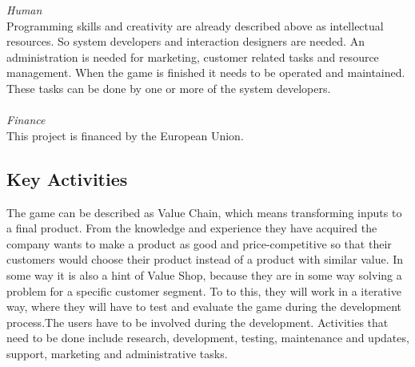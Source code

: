 \emph{Human} \\ Programming skills and creativity are already described above as intellectual resources. So system developers and interaction designers are needed. An administration is needed for marketing, customer related tasks and resource management. When the game is finished it needs to be operated and maintained. These tasks can be done by one or more of the system developers. \\ \\
\emph{Finance} \\ This project is financed by the European Union. 
\subsection{Key Activities}
The game can be described as Value Chain, which means transforming inputs to a final product. From the knowledge and experience they have acquired the company wants to make a product as good and price-competitive so that their customers would choose their product instead of a product with similar value. In some way it is also a hint of Value Shop, because they are in some way solving a problem for a specific customer segment. To to this, they will work in a iterative way, where they will have to test and evaluate the game during the development process.The users have to be involved during the development. 
Activities that need to be done include research, development, testing, maintenance and updates, support, marketing and administrative tasks. 
